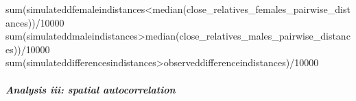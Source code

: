 \documentclass[
]{article}
\newenvironment{Shaded}{\begin{snugshade}}{\end{snugshade}}
\newcommand{\DecValTok}[1]{\textcolor[rgb]{0.00,0.00,0.81}{#1}}
\newcommand{\FunctionTok}[1]{\textcolor[rgb]{0.00,0.00,0.00}{#1}}
\newcommand{\NormalTok}[1]{#1}
\newcommand{\SpecialCharTok}[1]{\textcolor[rgb]{0.00,0.00,0.00}{#1}}
\begin{document}
\begin{Shaded}
\begin{Highlighting}[]
\FunctionTok{sum}\NormalTok{(simulateddfemaleindistances}\SpecialCharTok{\textless{}}\FunctionTok{median}\NormalTok{(close\_relatives\_females\_pairwise\_distances))}\SpecialCharTok{/}\DecValTok{10000}
\FunctionTok{sum}\NormalTok{(simulateddmaleindistances}\SpecialCharTok{\textgreater{}}\FunctionTok{median}\NormalTok{(close\_relatives\_males\_pairwise\_distances))}\SpecialCharTok{/}\DecValTok{10000}
\FunctionTok{sum}\NormalTok{(simulateddifferencesindistances}\SpecialCharTok{\textgreater{}}\NormalTok{observeddifferenceindistances)}\SpecialCharTok{/}\DecValTok{10000}
\end{Highlighting}
\end{Shaded}

\hypertarget{analysis-iii-spatial-autocorrelation-2}{%
\paragraph{\texorpdfstring{\emph{Analysis iii: spatial
autocorrelation}}{Analysis iii: spatial autocorrelation}}\label{analysis-iii-spatial-autocorrelation-2}}
\end{document}
